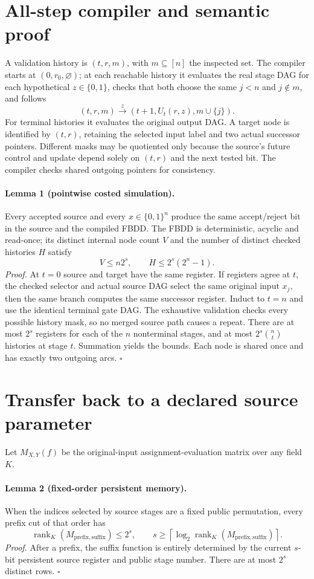 \documentclass[11pt]{article}
\begin{document}
\section{All-step compiler and semantic proof}
A validation history is $(t,r,m)$, with $m\subseteq[n]$ the inspected set. The compiler starts at $(0,r_0,\varnothing)$; at each reachable history it evaluates the real stage DAG for each hypothetical $z\in\{0,1\}$, checks that both choose the same $j<n$ and $j\notin m$, and follows
\[
(t,r,m)\xrightarrow{z}(t+1,U_t(r,z),m\cup\{j\}).
\]
For terminal histories it evaluates the original output DAG. A target node is identified by $(t,r)$, retaining the selected input label and two actual successor pointers. Different masks may be quotiented only because the source's future control and update depend solely on $(t,r)$ and the next tested bit. The compiler checks shared outgoing pointers for consistency.

\paragraph{Lemma 1 (pointwise costed simulation).}
Every accepted source and every $x\in\{0,1\}^n$ produce the same accept/reject bit in the source and the compiled FBDD. The FBDD is deterministic, acyclic and read-once; its distinct internal node count $V$ and the number of distinct checked histories $H$ satisfy
\[
V\leq n2^s,\qquad H\leq 2^s(2^n-1).
\]
\emph{Proof.} At $t=0$ source and target have the same register. If registers agree at $t$, the checked selector and actual source DAG select the same original input $x_j$, then the same branch computes the same successor register. Induct to $t=n$ and use the identical terminal gate DAG. The exhaustive validation checks every possible history mask, so no merged source path causes a repeat. There are at most $2^s$ registers for each of the $n$ nonterminal stages, and at most $2^s\binom nt$ histories at stage $t$. Summation yields the bounds. Each node is shared once and has exactly two outgoing arcs. \hfill$\square$

\section{Transfer back to a declared source parameter}
Let $M_{X,Y}(f)$ be the original-input assignment-evaluation matrix over any field $K$.

\paragraph{Lemma 2 (fixed-order persistent memory).}
When the indices selected by source stages are a fixed public permutation, every prefix cut of that order has
\[
\operatorname{rank}_K(M_{\mathrm{prefix},\mathrm{suffix}})\leq 2^s,
\qquad
s\geq\left\lceil\log_2\operatorname{rank}_K(M_{\mathrm{prefix},\mathrm{suffix}})\right\rceil.
\]
\emph{Proof.} After a prefix, the suffix function is entirely determined by the current $s$-bit persistent source register and public stage number. There are at most $2^s$ distinct rows. \hfill$\square$
\end{document}
